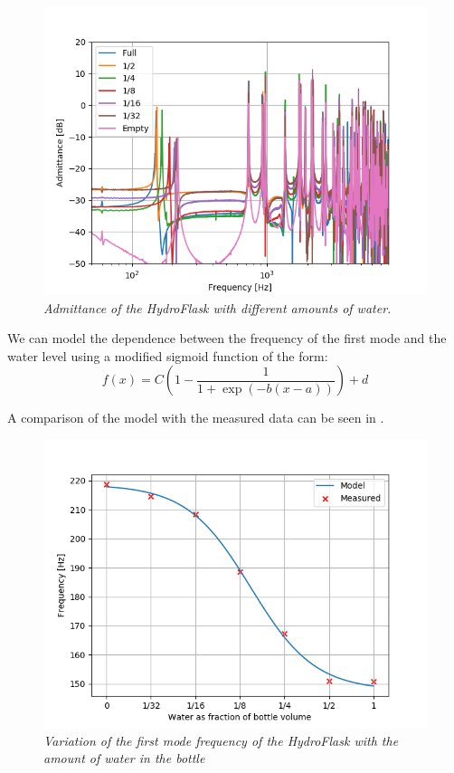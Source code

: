 \documentclass[twoside,a4paper]{article}
\begin{document}
%
\begin{figure}[!t]
    \centering
    \includegraphics[width=\linewidth,trim={0 0 1cm 1cm},clip]{../Figures/DifferentLevels/HydroWaterLevelsAdmitt}
    \caption{\it{Admittance of the HydroFlask with different amounts of water.}}
    \label{fig:hydro-different-water-levels}
\end{figure}
%
We can model the dependence between the frequency of the
first mode and the water level using a modified sigmoid
function of the form:
\begin{equation}
    f(x) = C \left(1 - \frac{1}{1 + \exp(-b(x-a))} \right) + d
    \label{eq:mod_sigmoid}
\end{equation}

A comparison of the model with the measured data can be seen in .
%
\begin{figure}[!htb]
    \centering
    \includegraphics[width=\linewidth,trim={0 0 1cm 1cm},clip]{../Figures/Water_Freq}
    \caption{\it{Variation of the first mode frequency of the HydroFlask
                with the amount of water in the bottle}}
    \label{fig:water-mode-freq}
\end{figure}
%
\end{document}
